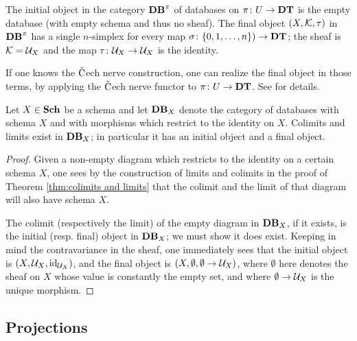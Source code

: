 \documentclass{amsart}
\def\DT{{\bf DT}}
\def\Sch{{\bf Sch}}
\def\Cech{$\check{\tn{C}}$ech }
\def\Data{{\bf DB}}
\begin{document}
\begin{remark}

The initial object in the category $\Data^\pi$ of databases on $\pi\taking U\to\DT$ is the empty database (with empty schema and thus no sheaf).  The final object $(X,\mathcal{K},\tau)$ in $\Data^\pi$ has a single $n$-simplex for every map $\sigma\taking\{0,1,\ldots,n\})\to\DT$; the sheaf is $\mathcal{K}=\mathcal{U}_X$ and the map $\tau\colon\mathcal{U}_X\rightarrow\mathcal{U}_X$ is the identity.

If one knows the \Cech nerve construction, one can realize the final object in those terms, by applying the \Cech nerve functor to $\pi\taking U\to\DT$.  See \cite[3.1]{Spi} for details.

\end{remark}

\begin{corollary}\label{cor:colimits and limits}

Let $X\in\Sch$ be a schema and let $\Data_X$ denote the category of databases with schema $X$ and with morphisms which restrict to the identity on $X$.  Colimits and limits exist in $\Data_X$; in particular it has an initial object and a final object.

\end{corollary}

\begin{proof}

Given a non-empty diagram which restricts to the identity on a certain schema $X$, one sees by the construction of limits and colimits in the proof of Theorem \ref{thm:colimits and limits} that the colimit and the limit of that diagram will also have schema $X$.  

The colimit (respectively the limit) of the empty diagram in $\Data_X$, if it exists, is the initial (resp. final) object in $\Data_X$; we must show it does exist.  Keeping in mind the contravariance in the sheaf, one immediately sees that the initial object is $(X,\mathcal{U}_X,\textnormal{id}_{\mathcal{U}_X})$, and the final object is $(X,\emptyset,\emptyset\rightarrow\mathcal{U}_X)$, where $\emptyset$ here denotes the sheaf on $X$ whose value is constantly the empty set, and where $\emptyset\rightarrow\mathcal{U}_X$ is the unique morphism.


\end{proof}

\subsection{Projections}\label{subsec:projections}
\end{document}
